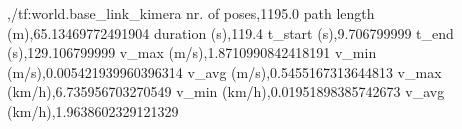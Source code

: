 ,/tf:world.base_link_kimera
nr. of poses,1195.0
path length (m),65.13469772491904
duration (s),119.4
t_start (s),9.706799999
t_end (s),129.106799999
v_max (m/s),1.8710990842418191
v_min (m/s),0.005421939960396314
v_avg (m/s),0.5455167313644813
v_max (km/h),6.735956703270549
v_min (km/h),0.01951898385742673
v_avg (km/h),1.9638602329121329
